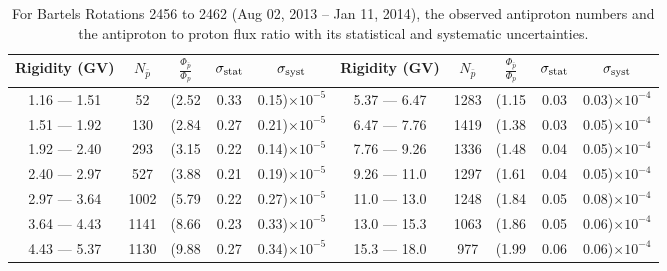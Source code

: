 \begin{table}[p] 
\renewcommand\baselinestretch{1.3}\selectfont
\setlength\tabcolsep{3pt}
\centering
\begin{tabular}{ccccc | ccccc}
\hline
\textbf{Rigidity}  (GV)  & $N_{\bar{p}}$ & $\frac{\Phi_{\bar{p}}}{\Phi_{p}}$ & $\sigma_{\rm{stat}}$ & $\sigma_{\rm{syst}}$ \hspace{1cm}   & \textbf{Rigidity}  (GV)  & $N_{\bar{p}}$ & $\frac{\Phi_{\bar{p}}}{\Phi_{p}}$ & $\sigma_{\rm{stat}}$ & $\sigma_{\rm{syst}}$ \hspace{1cm} \\ 
\hline
1.16 — 1.51   &  52                  &(2.52                          &  0.33              &      0.15)$\times 10^{-5}$  & 5.37 — 6.47                &  1283                    &(1.15                                &  0.03                   &      0.03)$\times 10^{-4}$\\
1.51 — 1.92   &  130                &(2.84                          &  0.27              &      0.21)$\times 10^{-5}$  & 6.47 — 7.76                &  1419                    &(1.38                                &  0.03                   &      0.05)$\times 10^{-4}$\\
1.92 — 2.40   &  293                &(3.15                          &  0.22              &      0.14)$\times 10^{-5}$  & 7.76 — 9.26                &  1336                    &(1.48                                &  0.04                   &      0.05)$\times 10^{-4}$\\    
2.40 — 2.97   &  527                &(3.88                          &  0.21              &      0.19)$\times 10^{-5}$  & 9.26 — 11.0                &  1297                    &(1.61                                &  0.04                   &      0.05)$\times 10^{-4}$\\    
2.97 — 3.64   &  1002              &(5.79                          &  0.22              &      0.27)$\times 10^{-5}$  & 11.0 — 13.0                 &  1248                    &(1.84                                & 0.05                   &      0.08)$\times 10^{-4}$\\
3.64 — 4.43   &  1141              &(8.66                          &  0.23              &      0.33)$\times 10^{-5}$  & 13.0 — 15.3               &  1063                    &(1.86                                &  0.05                   &      0.06)$\times 10^{-4}$\\
4.43 — 5.37   &  1130              &(9.88                          &  0.27              &      0.34)$\times 10^{-5}$  & 15.3 — 18.0               &  977                      &(1.99                                &  0.06                   &      0.06)$\times 10^{-4}$\\
\hline
\end{tabular}
\caption[Antiproton to proton flux ratio for Bartels Rotations 2456 to 2462]{For Bartels Rotations 2456 to 2462 (Aug 02, 2013 – Jan 11, 2014), the observed antiproton numbers and the antiproton to proton flux ratio with its statistical and systematic uncertainties.}
\label{TableOfDependent6}
\end{table}

